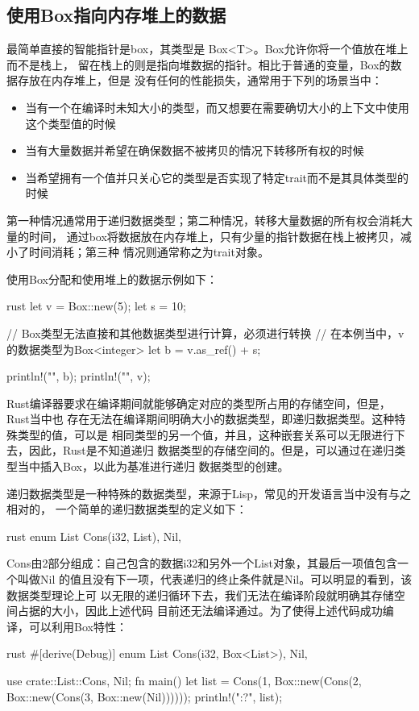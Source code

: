 \subsection{使用Box指向内存堆上的数据}
最简单直接的智能指针是box，其类型是 Box<T>。Box允许你将一个值放在堆上而不是栈上，
留在栈上的则是指向堆数据的指针。相比于普通的变量，Box的数据存放在内存堆上，但是
没有任何的性能损失，通常用于下列的场景当中：
\begin{itemize}
\item 当有一个在编译时未知大小的类型，而又想要在需要确切大小的上下文中使用这个类型值的时候
\item 当有大量数据并希望在确保数据不被拷贝的情况下转移所有权的时候
\item 当希望拥有一个值并只关心它的类型是否实现了特定trait而不是其具体类型的时候
\end{itemize}

第一种情况通常用于递归数据类型；第二种情况，转移大量数据的所有权会消耗大量的时间，
通过box将数据放在内存堆上，只有少量的指针数据在栈上被拷贝，减小了时间消耗；第三种
情况则通常称之为trait对象。

使用Box分配和使用堆上的数据示例如下：
\begin{code-block}{rust}
let v = Box::new(5);
let s = 10;

// Box类型无法直接和其他数据类型进行计算，必须进行转换
// 在本例当中，v的数据类型为Box<{integer}>
let b = v.as_ref() + s;

println!("{}", b);
println!("{}", v);
\end{code-block}

Rust编译器要求在编译期间就能够确定对应的类型所占用的存储空间，但是，Rust当中也
存在无法在编译期间明确大小的数据类型，即递归数据类型。这种特殊类型的值，可以是
相同类型的另一个值，并且，这种嵌套关系可以无限进行下去，因此，Rust是不知道递归
数据类型的存储空间的。但是，可以通过在递归类型当中插入Box，以此为基准进行递归
数据类型的创建。

递归数据类型是一种特殊的数据类型，来源于Lisp，常见的开发语言当中没有与之相对的，
一个简单的递归数据类型的定义如下：
\begin{code-block}{rust}
enum List {
    Cons(i32, List),
    Nil,
}
\end{code-block}
Cons由2部分组成：自己包含的数据i32和另外一个List对象，其最后一项值包含一个叫做Nil
的值且没有下一项，代表递归的终止条件就是Nil。可以明显的看到，该数据类型理论上可
以无限的递归循环下去，我们无法在编译阶段就明确其存储空间占据的大小，因此上述代码
目前还无法编译通过。为了使得上述代码成功编译，可以利用Box特性：
\begin{code-block}{rust}
#[derive(Debug)]
enum List {
    Cons(i32, Box<List>),
    Nil,
}

use crate::List::{Cons, Nil};
fn main() {
    let list = Cons(1, Box::new(Cons(2, Box::new(Cons(3, Box::new(Nil))))));
    println!("{:?}", list);
}
\end{code-block}

